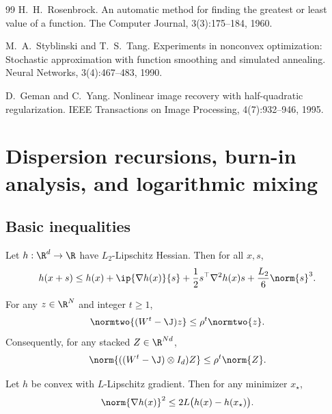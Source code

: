 \documentclass[review,onefignum,onetabnum]{siamart171218}
\begin{document}
\begin{thebibliography}{99}
		H.~H.~Rosenbrock.
		\newblock An automatic method for finding the greatest or least value of a function.
		\newblock The Computer Journal, 3(3):175--184, 1960.
		
		M.~A.~Styblinski and T.~S.~Tang.
		\newblock Experiments in nonconvex optimization: Stochastic approximation with function smoothing and simulated annealing.
		\newblock Neural Networks, 3(4):467--483, 1990.
		
		D.~Geman and C.~Yang.
		\newblock Nonlinear image recovery with half-quadratic regularization.
		\newblock IEEE Transactions on Image Processing, 4(7):932--946, 1995.
		
	\end{thebibliography}
	
	\appendix
	
	\section{Dispersion recursions, burn-in analysis, and logarithmic mixing}\label{app:dispersion}
	
	\subsection{Basic inequalities}\label{ssec:basic}
	\begin{lemma}\label{lem:taylor3}
		Let $h:\R^d\to\R$ have $L_2$-Lipschitz Hessian. Then for all $x,s$,
		\[
		h(x+s)\le h(x)+\ip{\nabla h(x)}{s}+\frac12 s^\top\nabla^2 h(x)s+\frac{L_2}{6}\norm{s}^3.
		\]
	\end{lemma}
	
	\begin{lemma}\label{lem:consensus}
		For any $z\in\R^N$ and integer $t\ge 1$,
		\[
		\normtwo{(W^t-\J)z}\le \rho^t\normtwo{z}.
		\]
		Consequently, for any stacked $Z\in\R^{Nd}$,
		\[
		\norm{((W^t-\J)\otimes I_d)Z}\le \rho^t\norm{Z}.
		\]
	\end{lemma}
	
	\begin{lemma}\label{lem:gap-grad}
		Let $h$ be convex with $L$-Lipschitz gradient. Then for any minimizer $x_\star$,
		\[
		\norm{\nabla h(x)}^2\le 2L\big(h(x)-h(x_\star)\big).
		\]
	\end{lemma}
	
\end{document}
